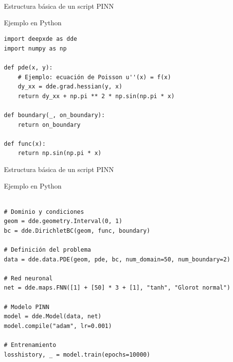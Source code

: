 \begin{frame}[fragile]{Estructura básica de un script PINN}
  \begin{block}{Ejemplo en Python}
    \begin{verbatim}
import deepxde as dde
import numpy as np

def pde(x, y):
    # Ejemplo: ecuación de Poisson u''(x) = f(x)
    dy_xx = dde.grad.hessian(y, x)
    return dy_xx + np.pi ** 2 * np.sin(np.pi * x)

def boundary(_, on_boundary):
    return on_boundary

def func(x):
    return np.sin(np.pi * x)

    \end{verbatim}
  \end{block}
\end{frame}


\begin{frame}[fragile]{Estructura básica de un script PINN}
  \begin{block}{Ejemplo en Python}
    \begin{verbatim}

# Dominio y condiciones
geom = dde.geometry.Interval(0, 1)
bc = dde.DirichletBC(geom, func, boundary)

# Definición del problema
data = dde.data.PDE(geom, pde, bc, num_domain=50, num_boundary=2)

# Red neuronal
net = dde.maps.FNN([1] + [50] * 3 + [1], "tanh", "Glorot normal")

# Modelo PINN
model = dde.Model(data, net)
model.compile("adam", lr=0.001)

# Entrenamiento
losshistory, _ = model.train(epochs=10000)
    \end{verbatim}
  \end{block}
\end{frame}
